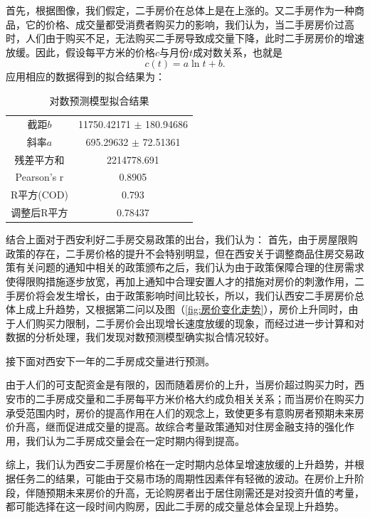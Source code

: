 \documentclass[withoutpreface,bwprint]{cumcmthesis} %
\begin{document}
首先，根据图像，我们假定，二手房价在总体上是在上涨的。又二手房作为一种商品，它的价格、成交量都受消费者购买力的影响，我们认为，当二手房房价过高时，人们由于购买不足，无法购买二手房导致成交量下降，此时二手房房价的增速放缓。因此，假设每平方米的价格$c$与月份$t$成对数关系，也就是
\begin{equation}
    c(t)=a\ln t+b.
\end{equation}
应用相应的数据得到的拟合结果为：
\begin{table}[H]
  \centering
  \caption{对数预测模型拟合结果}
    \begin{tabular}{cc}
    \toprule
    截距$b$    & 11750.42171 $\pm $ 180.94686 \\
    斜率$a$    & 695.29632 $\pm$ 72.51361 \\
    残差平方和 & 2214778.691 \\
    Pearson's r & 0.8905 \\
    R平方(COD) & 0.793 \\
    调整后R平方 & 0.78437 \\
    \bottomrule
    \end{tabular}%
    
\end{table}%

结合上面对于西安利好二手房交易政策的出台，我们认为：
首先，由于房屋限购政策的存在，二手房价格的提升不会特别明显，但在西安关于调整商品住房交易政策有关问题的通知中相关的政策颁布之后，我们认为由于政策保障合理的住房需求使得限购措施逐步放宽，再加上通知中合理安置人才的措施对房价的刺激作用，二手房价将会发生增长\cite{RN3}，由于政策影响时间比较长，所以，我们认西安二手房房价总体上成上升趋势，又根据第二问以及图（\ref{fig:房价变化走势}），房价上升同时，由于人们购买力限制，二手房价会出现增长速度放缓的现象，而经过进一步计算和对数据的分析处理，我们发现对数预测模型确实拟合情况较好。

接下面对西安下一年的二手房成交量进行预测。

由于人们的可支配资金是有限的，因而随着房价的上升，当房价超过购买力时，西安市的二手房成交量和二手房每平方米价格大约成负相关关系\cite{RN6}；而当房价在购买力承受范围内时，房价的提高作用在人们的观念上，致使更多有意购房者预期未来房价升高，继而促进成交量的提高。故综合考量政策通知对住房金融支持的强化作用，我们认为二手房成交量会在一定时期内得到提高。

综上，我们认为西安二手房屋价格在一定时期内总体呈增速放缓的上升趋势，并根据任务二的结果，可能由于交易市场的周期性因素伴有轻微的波动。在房价上升阶段，伴随预期未来房价的升高，无论购房者出于居住刚需还是对投资升值的考量，都可能选择在这一段时间内购房，因此二手房的成交量总体会呈现上升趋势。
\end{document}
